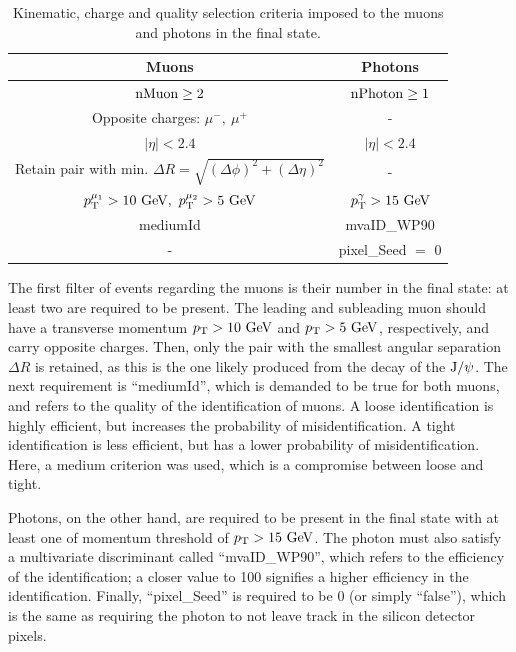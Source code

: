 \documentclass[11pt, a4paper]{article}
\newcommand{\GeV}{\textrm{ }\mathrm{GeV}}
\newcommand{\JPsi}{{\rm J}/\psi}
\newcommand{\pt}{p_{\rm T}}
\begin{document}
\begin{table}[htbp]
	\centering
	\begin{tabular}{cc}
		\toprule
		\multicolumn{1}{c}{{\bf Muons}} & \multicolumn{1}{c}{{\bf Photons}} \\ \midrule
		${\rm nMuon} \geq 2$ & ${\rm nPhoton} \geq 1$ \\
		Opposite charges: $\mu^{-},\ \mu^{+}$ & - \\
		$|\eta| < 2.4$ & $|\eta| < 2.4$\\
		Retain pair with min. $\Delta R = \sqrt{(\Delta\phi)^{2}+(\Delta \eta)^{2}}$ & - \\
        $\pt^{\mu_{1}}> 10\GeV,\ \pt^{\mu_{2}} > 5\GeV$ & $\pt^{\gamma} > 15 \GeV$ \\
        mediumId & mvaID\_WP90 \\
       - & pixel\_Seed $=$ 0 \\
        \bottomrule
	\end{tabular}
	\caption{Kinematic, charge and quality selection criteria imposed to the muons and photons in the final state.}
	\label{tab:selection}
\end{table}

The first filter of events regarding the muons is their number in the final state: at least two are required to be present. The leading and subleading muon should have a transverse momentum $\pt > 10\GeV$ and $\pt > 5\GeV$, respectively, and carry opposite charges. Then, only the pair with the smallest angular separation $\Delta R$ is retained, as this is the one likely produced from the decay of the $\JPsi$. The next requirement is ``mediumId'', which is demanded to be true for both muons, and refers to the quality of the identification of muons. A loose identification is highly efficient, but increases the probability of misidentification. A tight identification is less efficient, but has a lower probability of misidentification. Here, a medium criterion was used, which is a compromise between loose and tight.

Photons, on the other hand, are required to be present in the final state with at least one of momentum threshold of $\pt > 15 \GeV$. The photon must also satisfy a multivariate discriminant called ``mvaID\_WP90'', which refers to the efficiency of the identification; a closer value to 100 signifies a higher efficiency in the identification. Finally, ``pixel\_Seed'' is required to be 0 (or simply ``false''), which is the same as requiring the photon to not leave track in the silicon detector pixels.
\end{document}
